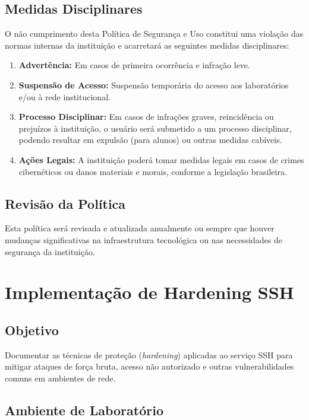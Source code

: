 \documentclass[12pt]{article}
\begin{document}
\subsection{Medidas Disciplinares}

O não cumprimento desta Política de Segurança e Uso constitui uma violação das normas internas da instituição e acarretará as seguintes medidas disciplinares:
\begin{enumerate}
    \item \textbf{Advertência:} Em casos de primeira ocorrência e infração leve.
    \item \textbf{Suspensão de Acesso:} Suspensão temporária do acesso aos laboratórios e/ou à rede institucional.
    \item \textbf{Processo Disciplinar:} Em casos de infrações graves, reincidência ou prejuízos à instituição, o usuário será submetido a um processo disciplinar, podendo resultar em expulsão (para alunos) ou outras medidas cabíveis.
    \item \textbf{Ações Legais:} A instituição poderá tomar medidas legais em casos de crimes cibernéticos ou danos materiais e morais, conforme a legislação brasileira.
\end{enumerate}

\subsection{Revisão da Política}

Esta política será revisada e atualizada anualmente ou sempre que houver mudanças significativas na infraestrutura tecnológica ou nas necessidades de segurança da instituição.

\section{Implementação de Hardening SSH}

\subsection{Objetivo}

Documentar as técnicas de proteção (\emph{hardening}) aplicadas ao serviço SSH para mitigar ataques de força bruta, acesso não autorizado e outras vulnerabilidades comuns em ambientes de rede.

\subsection{Ambiente de Laboratório}
\end{document}
